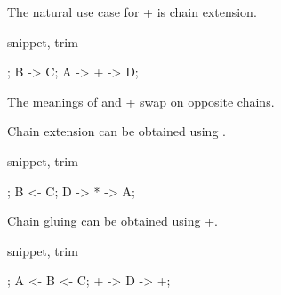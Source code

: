 The natural use case for {\ttfamily +} is chain extension.

\begin{tcblisting}{snippet, trim}
\begin{codi}
;
\mor B -> C;
\mor A -> + -> D;
\end{codi}
\end{tcblisting}

The meanings of {\ttfamily *} and {\ttfamily +} swap on opposite chains.

Chain extension can be obtained using {\ttfamily *}.

\begin{tcblisting}{snippet, trim}
\begin{codi}
;
\mor B <- C;
\mor D -> * -> A;
\end{codi}
\end{tcblisting}

Chain gluing can be obtained using {\ttfamily +}.

\begin{tcblisting}{snippet, trim}
\begin{codi}
;
\mor A <- B <- C;
\mor + -> D -> +;
\end{codi}
\end{tcblisting}

\endgroup
